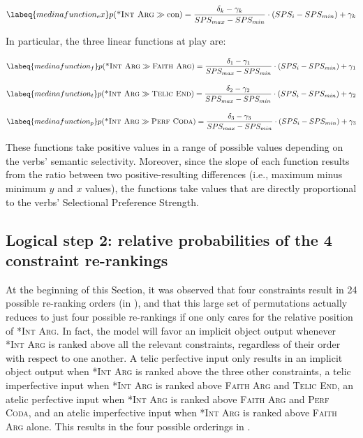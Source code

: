 \begin{equation} \labeq{medinafunction_ex}
p(\textsc{*Int Arg} \gg \textrm{con}) = \frac{\delta_k - \gamma_k}{SPS_{max} - SPS_{min}} \cdot ({SPS_{i} - SPS_{min}}) + \gamma_k
\end{equation}

In particular, the three linear functions at play are:

\begin{equation} \labeq{medinafunction_f}
p(\textsc{*Int Arg} \gg \textsc{Faith Arg}) = \frac{\delta_1 - \gamma_1}{SPS_{max} - SPS_{min}} \cdot ({SPS_{i} - SPS_{min}}) + \gamma_1
\end{equation}

\begin{equation} \labeq{medinafunction_t}
p(\textsc{*Int Arg} \gg \textsc{Telic End}) = \frac{\delta_2 - \gamma_2}{SPS_{max} - SPS_{min}} \cdot ({SPS_{i} - SPS_{min}}) + \gamma_2
\end{equation}

\begin{equation} \labeq{medinafunction_p}
p(\textsc{*Int Arg} \gg \textsc{Perf Coda}) = \frac{\delta_3 - \gamma_3}{SPS_{max} - SPS_{min}} \cdot ({SPS_{i} - SPS_{min}}) + \gamma_3
\end{equation}

These functions take positive values in a range of possible values depending on the verbs' semantic selectivity. Moreover, since the slope of each function results from the ratio between two positive-resulting differences (i.e., maximum minus minimum $y$ and $x$ values), the functions take values that are directly proportional to the verbs' Selectional Preference Strength.

\subsection{Logical step 2: relative probabilities of the 4 constraint re-rankings} 
At the beginning of this Section, it was observed that four constraints result in 24 possible re-ranking orders (in ), and that this large set of permutations actually reduces to just four possible re-rankings if one only cares for the relative position of \textsc{*Int Arg}. In fact, the model will favor an implicit object output whenever \textsc{*Int Arg} is ranked above all the relevant constraints, regardless of their order with respect to one another. A telic perfective input only results in an implicit object output when \textsc{*Int Arg} is ranked above the three other constraints, a telic imperfective input when \textsc{*Int Arg} is ranked above \textsc{Faith Arg} and \textsc{Telic End}, an atelic perfective input when \textsc{*Int Arg} is ranked above \textsc{Faith Arg} and \textsc{Perf Coda}, and an atelic imperfective input when \textsc{*Int Arg} is ranked above \textsc{Faith Arg} alone. This results in the four possible orderings in .

